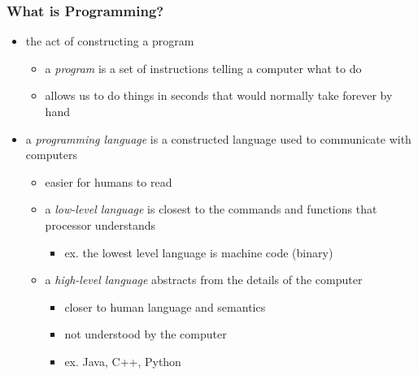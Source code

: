 \documentclass{beamer}
\begin{document}
\begin{frame}
\frametitle{What is Programming?}
\begin{itemize}
\item{the act of constructing a program}
	\begin{itemize}
		\item a \emph{program} is a set of instructions telling a computer what to do
		\item {allows us to do things in seconds that would normally take forever by hand}
	\end{itemize}
\item{a \emph{programming language} is a  constructed language used to communicate with computers}
	\begin{itemize}
		\item easier for humans to read
		\item a \emph{low-level language} is closest to the commands and functions that processor understands
			\begin{itemize}
				\item ex. the lowest level language is machine code (binary)
			\end{itemize}
		\item a \emph{high-level language} abstracts from the details of the  computer
			\begin{itemize}
				\item {closer to human language and semantics}
				\item {not understood by the computer}
				\item ex. Java, C++, Python
			\end{itemize}
	\end{itemize}
\end{itemize}
\end{frame}
\end{document}
